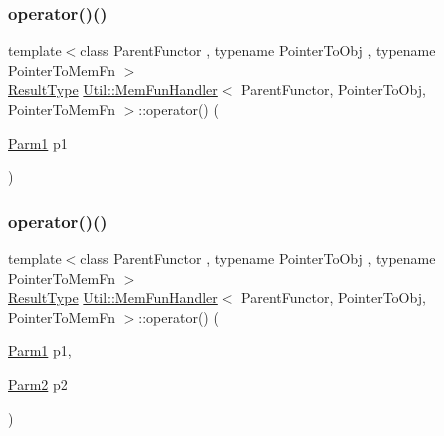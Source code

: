 \mbox{\label{classUtil_1_1MemFunHandler_a5d20125065c3cc89ca77c0c546923523}} 
\subsubsection{\texorpdfstring{operator()()}{operator()()}\hspace{0.1cm}{\footnotesize\ttfamily [6/18]}}
{\footnotesize\ttfamily template$<$class Parent\+Functor , typename Pointer\+To\+Obj , typename Pointer\+To\+Mem\+Fn $>$ \\
\mbox{\hyperlink{classUtil_1_1MemFunHandler_a093690dcced95ad48c5429e50006c83e}{Result\+Type}} \mbox{\hyperlink{classUtil_1_1MemFunHandler}{Util\+::\+Mem\+Fun\+Handler}}$<$ Parent\+Functor, Pointer\+To\+Obj, Pointer\+To\+Mem\+Fn $>$\+::operator() (\begin{DoxyParamCaption}\item[{\mbox{\hyperlink{classUtil_1_1MemFunHandler_a43182733677fc623d89e5613ecf15761}{Parm1}}}]{p1 }\end{DoxyParamCaption})\hspace{0.3cm}{\ttfamily [inline]}}

\mbox{\label{classUtil_1_1MemFunHandler_a193366447f7adcd2efceddfdefce2f9a}} 
\subsubsection{\texorpdfstring{operator()()}{operator()()}\hspace{0.1cm}{\footnotesize\ttfamily [7/18]}}
{\footnotesize\ttfamily template$<$class Parent\+Functor , typename Pointer\+To\+Obj , typename Pointer\+To\+Mem\+Fn $>$ \\
\mbox{\hyperlink{classUtil_1_1MemFunHandler_a093690dcced95ad48c5429e50006c83e}{Result\+Type}} \mbox{\hyperlink{classUtil_1_1MemFunHandler}{Util\+::\+Mem\+Fun\+Handler}}$<$ Parent\+Functor, Pointer\+To\+Obj, Pointer\+To\+Mem\+Fn $>$\+::operator() (\begin{DoxyParamCaption}\item[{\mbox{\hyperlink{classUtil_1_1MemFunHandler_a43182733677fc623d89e5613ecf15761}{Parm1}}}]{p1,  }\item[{\mbox{\hyperlink{classUtil_1_1MemFunHandler_a9d454c62047cb4bff3173b5bda9a38c8}{Parm2}}}]{p2 }\end{DoxyParamCaption})\hspace{0.3cm}{\ttfamily [inline]}}


